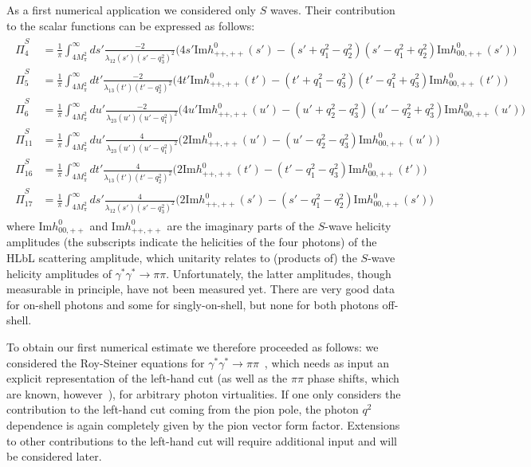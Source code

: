 \documentclass[epj]{webofc}
\renewcommand{\Im}{\mathrm{Im}}
\newcommand{\<}{\langle}
\renewcommand{\>}{\rangle}
\begin{document}
As a first numerical application we considered only $S$ waves. Their
contribution to the scalar functions can be expressed as follows:
 \begin{align}
  \begin{split}
		\hat\Pi_4^{S} &=\! \frac{1}{\pi} \int_{4M_\pi^2}^\infty  ds' \frac{-2}{\lambda_{12}(s')(s'-q_3^2)^2} \Big( 4s' \Im h^0_{++,++}(s') - (s'+q_1^2-q_2^2)(s'-q_1^2+q_2^2) \Im h^0_{00,++}(s') \Big)  \\
\hat\Pi_5^{S} &=\! \frac{1}{\pi} \int_{4M_\pi^2}^\infty dt' \frac{-2}{\lambda_{13}(t')(t'-q_2^2)^2} \Big( 4t' \Im h^0_{++,++}(t') - (t'+q_1^2-q_3^2)(t'-q_1^2+q_3^2) \Im h^0_{00,++}(t') \Big)  \\
\hat\Pi_6^{S} &=\! \frac{1}{\pi} \int_{4M_\pi^2}^\infty du' \frac{-2}{\lambda_{23}(u')(u'-q_1^2)^2} \Big( 4u' \Im h^0_{++,++}(u') - (u'+q_2^2-q_3^2)(u'-q_2^2+q_3^2) \Im h^0_{00,++}(u') \Big)  \\
		\hat\Pi_{11}^{S} &=\! \frac{1}{\pi} \int_{4M_\pi^2}^\infty du' \frac{4}{\lambda_{23}(u')(u'-q_1^2)^2} \Big( 2 \Im h^0_{++,++}(u') - (u'-q_2^2-q_3^2) \Im h^0_{00,++}(u') \Big)  \\
\hat\Pi_{16}^{S} &=\! \frac{1}{\pi} \int_{4M_\pi^2}^\infty dt' \frac{4}{\lambda_{13}(t')(t'-q_2^2)^2} \Big( 2 \Im h^0_{++,++}(t') - (t'-q_1^2-q_3^2) \Im h^0_{00,++}(t') \Big)  \\
\hat\Pi_{17}^{S} &=\! \frac{1}{\pi} \int_{4M_\pi^2}^\infty ds' \frac{4}{\lambda_{12}(s')(s'-q_3^2)^2} \Big( 2 \Im h^0_{++,++}(s') - (s'-q_1^2-q_2^2) \Im h^0_{00,++}(s') \Big) 
	\end{split}
\end{align}
where $\Im h^0_{00,++}$ and $\Im h^0_{++,++}$ are the imaginary parts of the
$S$-wave helicity amplitudes (the subscripts indicate the helicities of the
four photons) of the HLbL scattering amplitude, which unitarity relates to
(products of) the $S$-wave helicity amplitudes of $\gamma^* \gamma^* \to  
\pi \pi$. Unfortunately, the latter amplitudes, though measurable in
principle, have not been measured yet. There are very good data for
on-shell photons and some for singly-on-shell, but none for both photons
off-shell. 

To obtain our first numerical estimate we therefore proceeded as follows:
we considered the Roy-Steiner equations for $\gamma^* \gamma^* \to \pi
\pi$~\cite{Colangelo:2014dfa}, which needs as input an explicit
representation of the left-hand cut (as well as the $\pi \pi$ phase shifts,
which are known,
however~\cite{Colangelo:2001df,Caprini:2011ky,GarciaMartin:2011cn}), for
arbitrary photon virtualities. If one only considers the contribution to
the left-hand cut coming from the pion pole, the photon $q^2$ dependence is
again completely given by the pion vector form factor. Extensions to other
contributions to the left-hand cut will require additional input and will
be considered later.
\end{document}

